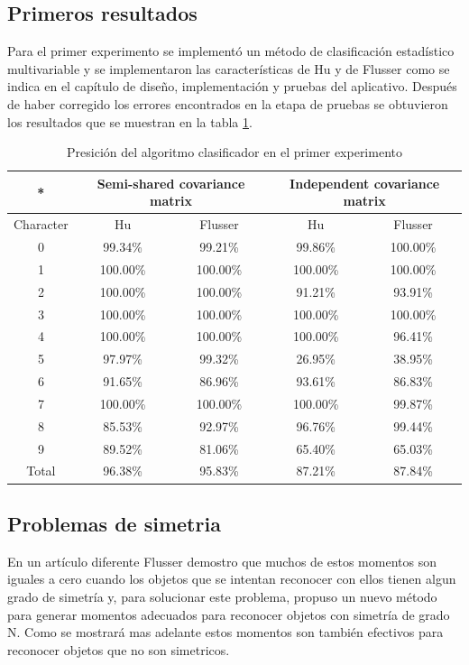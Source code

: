 \documentclass[a4paper, 11pt, oneside]{report}
\begin{document}
\subsection{Primeros resultados}
Para el primer experimento se implementó un método de clasificación estadístico multivariable y se implementaron las características de Hu y de Flusser como se indica en el capítulo de diseño, implementación y pruebas del aplicativo. Después de haber corregido los errores encontrados en la etapa de pruebas se obtuvieron los resultados que se muestran en la tabla \ref{tb:exp1}.
	\begin{table}
	\begin{center}
	\begin{tabular}{|c|c|c|c|c|}
		\hline
		* & \multicolumn{2}{|c|}{Semi-shared covariance matrix} &
			\multicolumn{2}{|c|}{Independent covariance matrix} \\
		\hline
		Character & Hu & Flusser & Hu & Flusser \\
		\hline
		0 & 99.34\% & 99.21\% & 99.86\% & 100.00\% \\
		1 &	100.00\% & 100.00\% & 100.00\% & 100.00\% \\
		2 &	100.00\% & 100.00\% & 91.21\% & 93.91\% \\
		3 &	100.00\% & 100.00\% & 100.00\% & 100.00\% \\
		4 &	100.00\% & 100.00\%	& 100.00\% & 96.41\% \\		
		5 & 97.97\% & 99.32\% & 26.95\% & 38.95\% \\ 
		6 & 91.65\% & 86.96\% & 93.61\% & 86.83\% \\
		7 & 100.00\% & 100.00\% & 100.00\% & 99.87\% \\
		8 & 85.53\% & 92.97\% & 96.76\% & 99.44\% \\
		9 &	89.52\% & 81.06\% & 65.40\% & 65.03\% \\
		\hline
		Total & 96.38\% & 95.83\% & 87.21\% & 87.84\% \\
		\hline
	\end{tabular}
	\end{center}
	\caption{Presición del algoritmo clasificador en el primer experimento}	
	\label{tb:exp1}
	\end{table}

\subsection{Problemas de simetria}

En un artículo diferente\cite{flusser06} Flusser demostro que muchos de estos momentos son iguales a cero cuando los objetos que se intentan reconocer con ellos tienen algun grado de simetría y, para solucionar este problema, propuso un nuevo método para generar momentos adecuados para reconocer objetos con simetría de grado N. Como se mostrará mas adelante estos momentos son también efectivos para reconocer objetos que no son simetricos.
\end{document}

